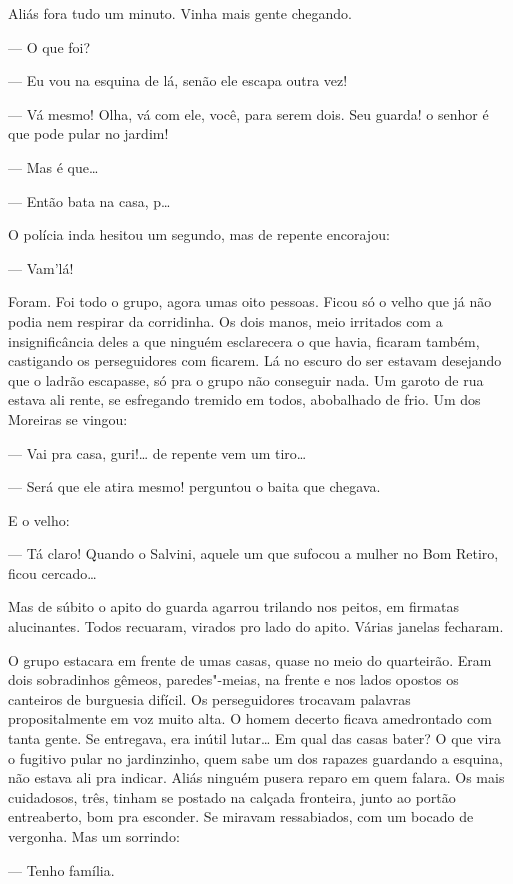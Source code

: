 Aliás fora tudo um minuto. Vinha mais gente chegando.

--- O que foi?

--- Eu vou na esquina de lá, senão ele escapa outra vez!

--- Vá mesmo! Olha, vá com ele, você, para serem dois. Seu guarda! o
senhor é que pode pular no jardim!

--- Mas é que\ldots{}

--- Então bata na casa, p\ldots{}

O polícia inda hesitou um segundo, mas de repente encorajou:

--- Vam'lá!

Foram. Foi todo o grupo, agora umas oito pessoas. Ficou só o velho que
já não podia nem respirar da corridinha. Os dois manos, meio irritados
com a insignificância deles a que ninguém esclarecera o que havia,
ficaram também, castigando os perseguidores com ficarem. Lá no escuro do
ser estavam desejando que o ladrão escapasse, só pra o grupo não
conseguir nada. Um garoto de rua estava ali rente, se esfregando tremido
em todos, abobalhado de frio. Um dos Moreiras se vingou:

--- Vai pra casa, guri!\ldots{} de repente vem um tiro\ldots{}

--- Será que ele atira mesmo! perguntou o baita que chegava.

E o velho:

--- Tá claro! Quando o Salvini, aquele um que sufocou a mulher no Bom
Retiro, ficou cercado\ldots{}

Mas de súbito o apito do guarda agarrou trilando nos peitos, em firmatas
alucinantes. Todos recuaram, virados pro lado do apito. Várias janelas
fecharam.

O grupo estacara em frente de umas casas, quase no meio do quarteirão.
Eram dois sobradinhos gêmeos, paredes"-meias, na frente e nos lados
opostos os canteiros de burguesia difícil. Os perseguidores trocavam
palavras propositalmente em voz muito alta. O homem decerto ficava
amedrontado com tanta gente. Se entregava, era inútil lutar\ldots{} Em qual
das casas bater? O que vira o fugitivo pular no jardinzinho, quem sabe
um dos rapazes guardando a esquina, não estava ali pra indicar. Aliás
ninguém pusera reparo em quem falara. Os mais cuidadosos, três, tinham
se postado na calçada fronteira, junto ao portão entreaberto, bom pra
esconder. Se miravam ressabiados, com um bocado de vergonha. Mas um
sorrindo:

--- Tenho família.


